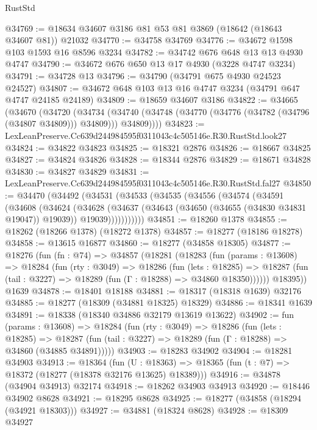 \begin{lexlean}{RustStd}
\begin{coremodule}
@34769 := @18634 @34607 @3186 @81 @53 @81 @3869 (@18642 (@18643 @34607 @81)) @21032
@34770 := @34758 @34769
@34776 := @34672 @1598 @103 @1593 @16 @8596 @3234
@34782 := @34742 @676 @648 @13 @13 @4930 @4747
@34790 := @34672 @676 @650 @13 @17 @4930 (@3228 @4747 @3234)
@34791 := @34728 @13
@34796 := @34790 (@34791 @675 @4930 @24523 @24527)
@34807 := @34672 @648 @103 @13 @16 @4747 @3234 (@34791 @647 @4747 @24185 @24189)
@34809 := @18659 @34607 @3186
@34822 := @34665
    (@34670
      (@34720
        (@34734
          (@34740 (@34748 (@34770 (@34776 (@34782 (@34796 (@34807 @34809))) @34809))) @34809))))
@34823 := LexLeanPreserve.Cc639d244984595f0311043c4c505146e.R30.RustStd.look27
@34824 := @34822 @34823
@34825 := @18321 @2876
@34826 := @18667 @34825
@34827 := @34824 @34826
@34828 := @18344 @2876
@34829 := @18671 @34828
@34830 := @34827 @34829
@34831 := LexLeanPreserve.Cc639d244984595f0311043c4c505146e.R30.RustStd.fal27
@34850 := @34470
    (@34492
      (@34531
        (@34533
          (@34535
            (@34556
              (@34574
                (@34591
                  (@34608
                    (@34624
                      (@34628
                        (@34637
                          (@34643 (@34650 (@34655 (@34830 @34831 @19047)) @19039))
                          @19039)))))))))))
@34851 := @18260 @1378
@34855 := @18262 (@18266 @1378) (@18272 @1378)
@34857 := @18277 (@18186 @18278)
@34858 := @13615 @16877
@34860 := @18277 (@34858 @18305)
@34877 := @18276
    (fun (fn : @74) =>
    @34857
      (@18281
        (@18283
          (fun (params : @13608) =>
          @18284
            (fun (rty : @3049) =>
            @18286
              (fun (lets : @18285) =>
              @18287 (fun (tail : @3227) => @18289 (fun (Γ : @18288) => @34860 @18350))))))
        @18395))
    @1639
@34878 := @18401 @18188
@34881 := @18317 (@18318 @1639) @32176
@34885 := @18277 (@18309 (@34881 @18325) @18329)
@34886 := @18341 @1639
@34891 := @18338 (@18340 @34886 @32179 @13619 @13622)
@34902 := fun (params : @13608) =>
  @18284
    (fun (rty : @3049) =>
    @18286
      (fun (lets : @18285) =>
      @18287 (fun (tail : @3227) => @18289 (fun (Γ : @18288) => @34860 (@34885 @34891)))))
@34903 := @18283 @34902
@34904 := @18281 @34903
@34913 := @18364
    (fun (U : @18363) => @18365 (fun (t : @7) => @18372 (@18277 (@18378 @32176 @13625) @18389)))
@34916 := @34878 (@34904 @34913) @32174
@34918 := @18262 @34903 @34913
@34920 := @18446 @34902 @8628
@34921 := @18295 @8628
@34925 := @18277 (@34858 (@18294 (@34921 @18303)))
@34927 := @34881 (@18324 @8628)
@34928 := @18309 @34927

\end{coremodule}
\end{lexlean}
